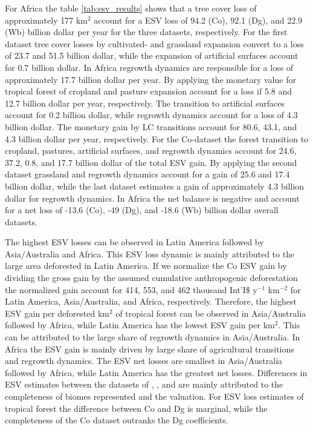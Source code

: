 		For Africa the table \ref{tab:esv_results} shows that a tree cover loss of approximately 177 km$^2$ account for a \ac{ESV} loss of 94.2 (Co), 92.1 (Dg), and 22.9 (Wb) billion dollar per year for the three datasets, respectively. For the first dataset tree cover losses by cultivated- and grassland expansion convert to a loss of 23.7 and 51.5 billion dollar, while the expansion of artificial surfaces account for 0.7 billion dollar. In Africa regrowth dynamics are responsible for a loss of approximately 17.7 billion dollar per year. By applying the monetary value for tropical forest of \citet{Siikamaki2015} cropland and pasture expansion account for a loss if 5.8 and 12.7 billion dollar per year, respectively. The transition to artificial surfaces account for 0.2 billion dollar, while regrowth dynamics account for a loss of 4.3 billion dollar. The monetary gain by \ac{LC} transitions account for 80.6, 43.1, and 4.3 billion dollar per year, respectively. For the Co-dataset the forest transition to cropland, pastures, artificial surfaces, and regrowth dynamics account for 24.6, 37.2, 0.8, and 17.7 billion dollar of the total \ac{ESV} gain. By applying the second dataset grassland and regrowth dynamics account for a gain of 25.6 and 17.4 billion dollar, while the last dataset estimates a gain of approximately 4.3 billion dollar for regrowth dynamics. In Africa the net balance is negative and account for a net loss of -13.6 (Co), -49 (Dg), and -18.6 (Wb) billion dollar overall datasets.

		The highest \ac{ESV} losses can be observed in Latin America followed by Asia/Australia and Africa. This \ac{ESV} loss dynamic is mainly attributed to the large area deforested in Latin America. If we normalize the Co \ac{ESV} gain by dividing the gross gain by the assumed cumulative anthropogenic deforestation the normalized gain account for 414, 553, and 462 thousand Int'I\$ y$^{-1}$ km$^{-2}$ for Latin America, Asia/Australia, and Africa, respectively. Therefore, the highest \ac{ESV} gain per deforested km$^2$ of tropical forest can be observed in Asia/Australia followed by Africa, while Latin America has the lowest \ac{ESV} gain per km$^2$. This can be attributed to the large share of regrowth dynamics in Asia/Australia. In Africa the \ac{ESV} gain is mainly driven by large share of agricultural transitions and regrowth dynamics. The \ac{ESV} net losses are smallest in Asia/Australia followed by Africa, while Latin America has the greatest net losses. Differences in \ac{ESV} estimates between the datasets of \citet{Costanza2014}, \citet{Groot2012}, and \citet{Siikamaki2015} are mainly attributed to the completeness of biomes represented and the valuation. For \ac{ESV} loss estimates of tropical forest the difference between Co and Dg is marginal, while the completeness of the Co dataset outranks the Dg coefficients.